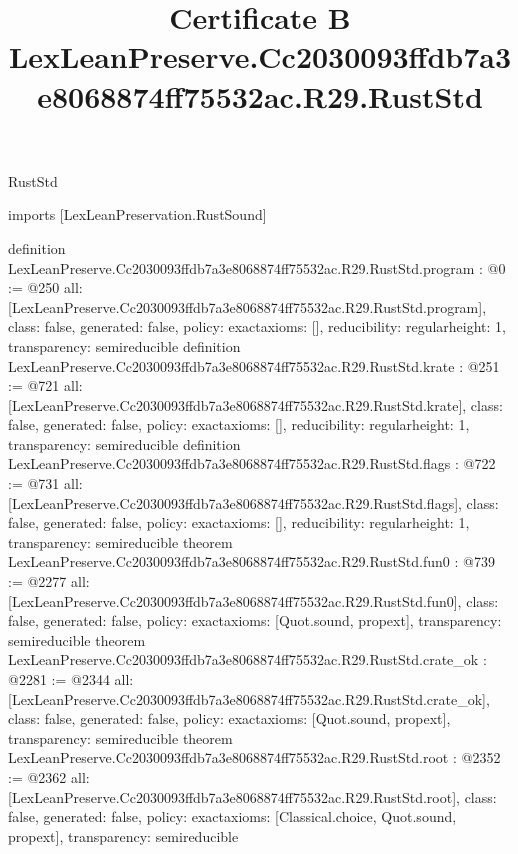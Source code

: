 \begin{lexlean}{RustStd}
\title{Certificate B LexLeanPreserve.Cc2030093ffdb7a3e8068874ff75532ac.R29.RustStd}
\begin{coremodule}
imports [LexLeanPreservation.RustSound]

definition LexLeanPreserve.Cc2030093ffdb7a3e8068874ff75532ac.R29.RustStd.program : @0 := @250 {
  all: [LexLeanPreserve.Cc2030093ffdb7a3e8068874ff75532ac.R29.RustStd.program],
  class: false,
  generated: false,
  policy: exact{axioms: []},
  reducibility: regular{height: 1},
  transparency: semireducible
}
definition LexLeanPreserve.Cc2030093ffdb7a3e8068874ff75532ac.R29.RustStd.krate : @251 := @721 {
  all: [LexLeanPreserve.Cc2030093ffdb7a3e8068874ff75532ac.R29.RustStd.krate],
  class: false,
  generated: false,
  policy: exact{axioms: []},
  reducibility: regular{height: 1},
  transparency: semireducible
}
definition LexLeanPreserve.Cc2030093ffdb7a3e8068874ff75532ac.R29.RustStd.flags : @722 := @731 {
  all: [LexLeanPreserve.Cc2030093ffdb7a3e8068874ff75532ac.R29.RustStd.flags],
  class: false,
  generated: false,
  policy: exact{axioms: []},
  reducibility: regular{height: 1},
  transparency: semireducible
}
theorem LexLeanPreserve.Cc2030093ffdb7a3e8068874ff75532ac.R29.RustStd.fun0 : @739 := @2277 {
  all: [LexLeanPreserve.Cc2030093ffdb7a3e8068874ff75532ac.R29.RustStd.fun0],
  class: false,
  generated: false,
  policy: exact{axioms: [Quot.sound, propext]},
  transparency: semireducible
}
theorem LexLeanPreserve.Cc2030093ffdb7a3e8068874ff75532ac.R29.RustStd.crate_ok : @2281 := @2344 {
  all: [LexLeanPreserve.Cc2030093ffdb7a3e8068874ff75532ac.R29.RustStd.crate_ok],
  class: false,
  generated: false,
  policy: exact{axioms: [Quot.sound, propext]},
  transparency: semireducible
}
theorem LexLeanPreserve.Cc2030093ffdb7a3e8068874ff75532ac.R29.RustStd.root : @2352 := @2362 {
  all: [LexLeanPreserve.Cc2030093ffdb7a3e8068874ff75532ac.R29.RustStd.root],
  class: false,
  generated: false,
  policy: exact{axioms: [Classical.choice, Quot.sound, propext]},
  transparency: semireducible
}


\end{coremodule}
\end{lexlean}
